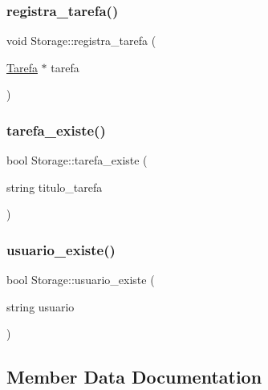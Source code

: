 \mbox{\label{classStorage_a128d891f8907c1089e8ac925743b0446}} 
\subsubsection{\texorpdfstring{registra\+\_\+tarefa()}{registra\_tarefa()}}
{\footnotesize\ttfamily void Storage\+::registra\+\_\+tarefa (\begin{DoxyParamCaption}\item[{\hyperlink{classTarefa}{Tarefa} $\ast$}]{tarefa }\end{DoxyParamCaption})}

\mbox{\label{classStorage_a501b15eb866bfbc27aa968ce96b8ae8b}} 
\subsubsection{\texorpdfstring{tarefa\+\_\+existe()}{tarefa\_existe()}}
{\footnotesize\ttfamily bool Storage\+::tarefa\+\_\+existe (\begin{DoxyParamCaption}\item[{string}]{titulo\+\_\+tarefa }\end{DoxyParamCaption})}

\mbox{\label{classStorage_adb9fc5565d70a106da231654e15cf090}} 
\subsubsection{\texorpdfstring{usuario\+\_\+existe()}{usuario\_existe()}}
{\footnotesize\ttfamily bool Storage\+::usuario\+\_\+existe (\begin{DoxyParamCaption}\item[{string}]{usuario }\end{DoxyParamCaption})}



\subsection{Member Data Documentation}
\mbox{\label{classStorage_ad9934ed8b6423a91135819a7f301ffba}} 
